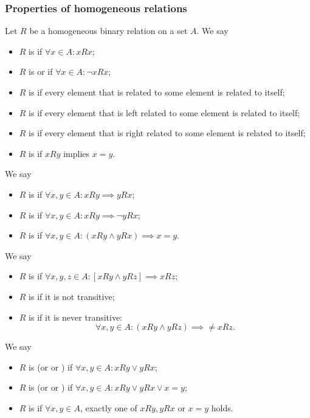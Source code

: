 \subsubsection{Properties of homogeneous relations}
\begin{definition}
Let $R$ be a homogeneous binary relation on a set $A$. We say
\begin{itemize}
\item $R$ is  if $\forall x\in A: xRx$;
\item $R$ is  or  if $\forall x\in A: \neg xRx$;
\item $R$ is  if every element that is related to some element is related to itself;
\item $R$ is  if every element that is left related to some element is related to itself;
\item $R$ is  if every element that is right related to some element is related to itself;
\item $R$ is  if $xRy$ implies $x=y$.
\end{itemize}
We say
\begin{itemize}
\item $R$ is  if $\forall x,y\in A: xRy \implies yRx$;
\item $R$ is  if $\forall x,y\in A: xRy \implies \neg yRx$;
\item $R$ is  if $\forall x,y\in A: (xRy\land yRx) \implies x=y$.
\end{itemize}
We say
\begin{itemize}
\item $R$ is  if $\forall x,y,z\in A: [xRy \land yRz] \implies xRz$;
\item $R$ is  if it is not transitive;
\item $R$ is  if it is never transitive:
\[ \forall x,y\in A: (xRy\land yRz) \implies \neq xRz.\]
\end{itemize}
We say
\begin{itemize}
\item $R$ is  (or  or ) if $\forall x,y\in A: xRy \lor yRx$;
\item $R$ is  (or  or ) if $\forall x,y\in A: xRy \lor yRx \lor x=y$;
\item $R$ is  if $\forall x,y\in A$, exactly one of $xRy, yRx$ or $x=y$ holds.

\end{itemize}
\end{definition}
